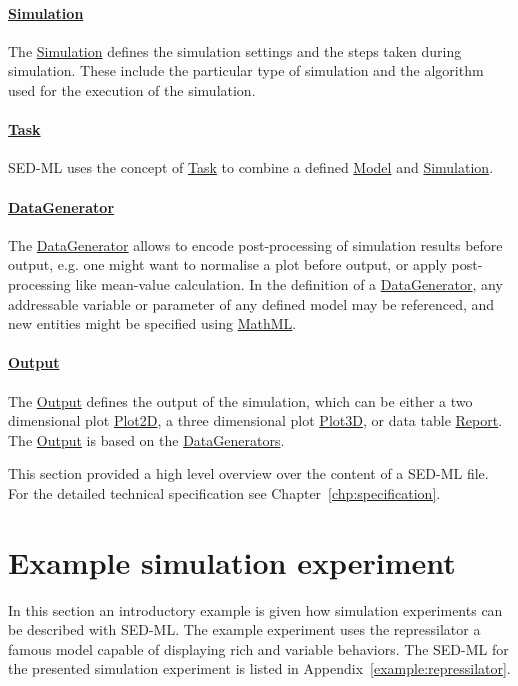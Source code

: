 \paragraph*{\hyperref[class:simulation]{Simulation}}
The \hyperref[class:simulation]{Simulation} defines the simulation settings and the steps taken during simulation. These include the particular type of simulation and the algorithm used for the execution of the simulation.

\paragraph*{\hyperref[class:task]{Task}}
SED-ML uses the concept of \hyperref[class:task]{Task} to combine a defined \hyperref[class:model]{Model} and \hyperref[class:simulation]{Simulation}.

\paragraph*{\hyperref[class:dataGenerator]{DataGenerator}}
The \hyperref[class:dataGenerator]{DataGenerator} allows to encode post-processing of simulation results before output, e.g. one might want to normalise a plot before output, or apply post-processing like mean-value calculation. In the definition of a \hyperref[class:dataGenerator]{DataGenerator}, any addressable variable or parameter of any defined model may be referenced, and new entities might be specified using \hyperref[sec:mathML]{MathML}.

\paragraph*{\hyperref[class:output]{Output}}
The \hyperref[class:output]{Output} defines the output of the simulation, which can be either a two dimensional plot \hyperref[class:plot2D]{Plot2D}, a three dimensional plot \hyperref[class:plot3D]{Plot3D}, or data table \hyperref[class:report]{Report}. The \hyperref[class:output]{Output} is based on the \hyperref[class:dataGenerator]{DataGenerators}.

This section provided a high level overview over the content of a SED-ML file. For the detailed technical specification see Chapter~\ref{chp:specification}. 

\section{Example simulation experiment}
\label{motivation:example}
In this section an introductory example is given how simulation experiments can be described with SED-ML. The example experiment uses the repressilator \citep{Elowitz:2000} a famous model capable of displaying rich and variable behaviors. The SED-ML for the presented simulation experiment is listed in Appendix~\ref{example:repressilator}.

